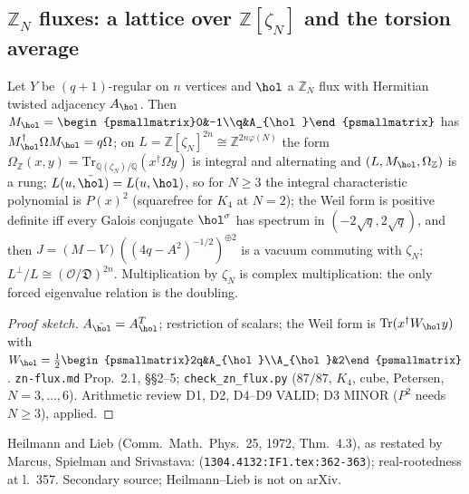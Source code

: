 \subsection{$\mathbb Z_N$ fluxes: a lattice over $\mathbb Z[\zeta_N]$ and the torsion average}

\begin{proposition}
\label{prop:gkp-zn-lattice-state} 
Let $Y$ be $(q+1)$-regular on $n$ vertices and $\hol$ a $\mathbb Z_N$ flux with Hermitian twisted adjacency $A_{\hol}$. Then $M_{\hol} =
\begin{psmallmatrix}0&-1\\q&A_{\hol}\end{psmallmatrix}$ has $M_{\hol}^\dagger\Omega M_{\hol} = q\Omega$; on $L = \mathbb Z[\zeta_N]^{2n}\cong\mathbb Z^{2n\varphi(N)}$ %
the form $\Omega_{\mathbb Z}(x,y) = \mathrm{Tr}_{\mathbb Q(\zeta_N)/\mathbb Q}(x^\dagger\Omega y)$ is integral and alternating and $(L,M_{\hol},\Omega_{\mathbb Z})$ is a rung; %
$L(u,\bar\hol) = L(u,\hol)$, so for $N\ge3$ the integral characteristic polynomial is $P(x)^2$ (squarefree for $K_4$ at $N = 2$); the Weil form is positive definite iff every
Galois conjugate $\hol^\sigma$ has spectrum in $(-2\sqrt q,2\sqrt q)$, and then $J = (M-V)((4q-A^2)^{-1/2})^{\oplus2}$ is a vacuum commuting with $\zeta_N$; %
$L^\perp/L\cong(\mathcal O/\mathfrak D)^{2n}$. Multiplication by $\zeta_N$ is complex multiplication: the only forced eigenvalue relation is the doubling.
\end{proposition}
\begin{proof}[Proof sketch] $A_{\bar\hol} = A_{\hol}^T$; restriction of scalars; the Weil form is $\mathrm{Tr}(x^\dagger W_{\hol}y)$ with $W_{\hol} =
\tfrac12\begin{psmallmatrix}2q&A_{\hol}\\A_{\hol}&2\end{psmallmatrix}$. \texttt{zn-flux.md} Prop.~2.1, \S\S2--5; \texttt{check\_zn\_flux.py} ($87/87$, $K_4$, cube, Petersen, $N =
3,\dots,6$). Arithmetic review D1, D2, D4--D9 VALID; D3 MINOR ($P^2$ needs $N\ge3$), applied.
\end{proof}
\begin{theorem}
\label{cit:heilmann-lieb-mss} 
Heilmann and Lieb (Comm.\ Math.\ Phys.\ 25, 1972, Thm.~4.3), as restated by Marcus, Spielman and Srivastava: \texttt{} (\texttt{1304.4132:IF1.tex:362-363}); real-rootedness at l.~357. Secondary source; Heilmann--Lieb is not
on arXiv.
\end{theorem}
